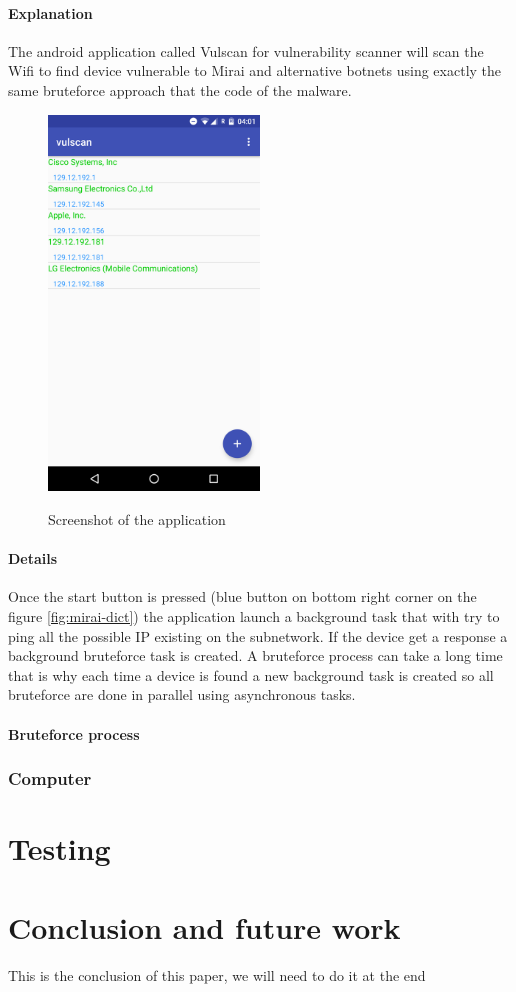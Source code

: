 \documentclass{report}
\begin{document}
\subsubsection{Explanation}
The android application called Vulscan for vulnerability scanner will scan the Wifi to find device vulnerable to Mirai and alternative botnets using exactly the same bruteforce approach that the code of the malware.
\begin{figure}[h]
 \caption{Screenshot of the application}
 \centering
 \includegraphics[width=0.5\textwidth]{./img/screen-act}
 \label{fig:screen-act}
\end{figure}

\subsubsection{Details}
Once the start button is pressed (blue button on bottom right corner on the figure \ref{fig:mirai-dict}) the application launch a background task that with try to ping all the possible IP existing on the subnetwork. If the device get a response a background bruteforce task is created. A bruteforce process can take a long time that is why each time a device is found a new background task is created so all bruteforce are done in parallel using asynchronous tasks.

\subsubsection{Bruteforce process}


\subsection{Computer}

\chapter{Testing}

\chapter{Conclusion and future work}
This is the conclusion of this paper, we will need to do it at the end

\printbibliography

\listoffigures
\end{document}
